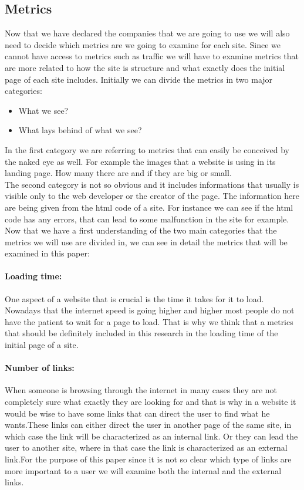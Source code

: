 \documentclass{article}
\begin{document}
\subsection{Metrics}
Now that we have declared the companies that we are going to use we will also need to decide which metrics are we going to examine for each site. Since we cannot have access to metrics such as traffic we will have to examine metrics that are more related to how the site is structure and what exactly does the initial page of each site includes. Initially we can divide the metrics in two major categories:
\begin{itemize}
\item What we see?
\item What lays behind of what we see?
\end{itemize}
In the first category we are referring to metrics that can easily be conceived by the naked eye as well. For example the images that a website is using in its landing page. How many there are and if they are big or small.\\
The second category is not so obvious and it includes informations that usually is visible only to the web developer or the creator of the page. The information here are being given from the html code of a site. For instance we can see if the html code has any errors, that can lead to some malfunction in the site for example.\\
Now that we have a first understanding of the two main categories that the metrics we will use are divided in, we can see in detail the metrics that will be examined in this paper:
\paragraph{Loading time:}One aspect of a website that is crucial is the time it takes for it to load. Nowadays that the internet speed is going higher and higher most people do not have the patient to wait for a page to load. That is why we think that a metrics that should be definitely included in this research in the loading time of the initial page of a site.
\paragraph{Number of links:}When someone is browsing through the internet in many cases they are not completely sure what exactly they are looking for and that is why in a website it would be wise to have some links that can direct the user to find what he wants.These links can either direct the user in another page of the same site, in which case the link will be characterized as an internal link. Or they can lead the user to another site, where in that case the link is characterized as an external link.For the purpose of this paper since it is not so clear which type of links are more important to a user we will examine both the internal and the external links.
\end{document}
